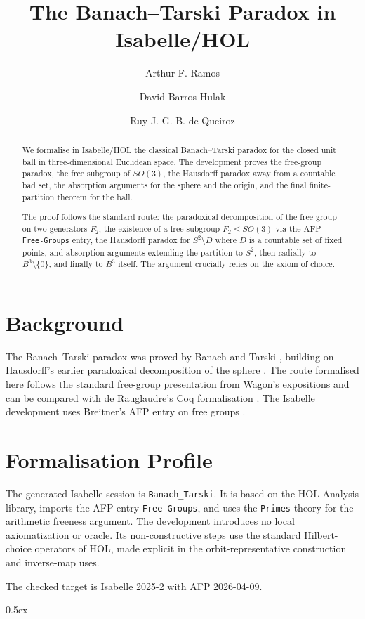 \documentclass[11pt,a4paper]{article}
\begin{document}
\title{The Banach--Tarski Paradox in Isabelle/HOL}
\author{Arthur F. Ramos \and David Barros Hulak \and Ruy J. G. B. de Queiroz}
\date{}
\maketitle

\begin{abstract}
We formalise in Isabelle/HOL the classical Banach--Tarski paradox for the
closed unit ball in three-dimensional Euclidean space.  The development
proves the free-group paradox, the free subgroup of \(SO(3)\),
the Hausdorff paradox away from a countable bad set, the absorption
arguments for the sphere and the origin, and the final finite-partition
theorem for the ball.

The proof follows the standard route: the paradoxical decomposition of the
free group on two generators \(F_2\), the existence of a free subgroup
\(F_2 \le SO(3)\) via the AFP \texttt{Free-Groups} entry, the Hausdorff
paradox for \(S^2 \setminus D\) where \(D\) is a countable set of fixed
points, and absorption arguments extending the partition to \(S^2\), then
radially to \(B^3 \setminus \{0\}\), and finally to \(B^3\) itself.
The argument crucially relies on the axiom of choice.
\end{abstract}

\section*{Background}

The Banach--Tarski paradox was proved by Banach and Tarski
\cite{BanachTarski1924}, building on Hausdorff's earlier paradoxical
decomposition of the sphere \cite{Hausdorff1914}.  The route formalised here
follows the standard free-group presentation from Wagon's expositions
\cite{Wagon1993,TomkowiczWagon2016} and can be compared with de Rauglaudre's
Coq formalisation \cite{deRauglaudre2017BanachTarski}.  The Isabelle
development uses Breitner's AFP entry on free groups
\cite{AFPFreeGroups}.

\section*{Formalisation Profile}

The generated Isabelle session is \texttt{Banach\_Tarski}.  It is based on the
HOL Analysis library, imports the AFP entry \texttt{Free-Groups}, and uses
the \texttt{Primes} theory for the arithmetic freeness
argument.  The development introduces no local axiomatization or oracle.
Its non-constructive steps use the standard Hilbert-choice operators of
HOL, made explicit in the orbit-representative construction and inverse-map
uses.

The checked target is Isabelle 2025-2 with AFP 2026-04-09.

\tableofcontents

\parindent 0pt\parskip 0.5ex



\nocite{*}


\end{document}
